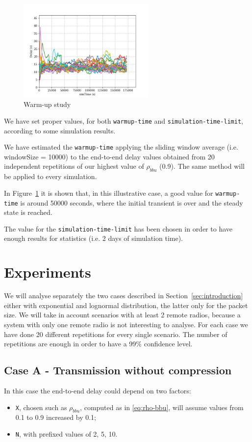 \documentclass[11pt,a4paper,oneside, openright]{article}
\begin{document}
\begin{figure}[H]
  \centering
  \includegraphics[width=0.6\textwidth]{images/warm-up}
  \caption{Warm-up study}
  \label{fig:warm-up-study}
\end{figure}

We have set proper values, for both \texttt{warmup-time} and \texttt{simulation-time-limit}, according to some simulation results.

We have estimated the \texttt{warmup-time} applying the sliding window average (i.e. windowSize = 10000) to the end-to-end delay values obtained from 20 independent repetitions of our highest value of $ \rho_{bbu} $ (0.9). The same method will be applied to every simulation.

In Figure~\ref{fig:warm-up-study} it is shown that, in this illustrative case, a good value for \texttt{warmup-time} is around 50000 seconds, where the initial transient is over and the steady state is reached. 

The value for the \texttt{simulation-time-limit} has been chosen in order to have enough results for statistics (i.e. 2 days of simulation time).

\section{Experiments}
We will analyse separately the two cases described in Section~\ref{sec:introduction} either with exponential and lognormal distribution, the latter only for the packet size.
We will take in account scenarios with at least 2 remote radios, because a system with only one remote radio is not interesting to analyse. For each case we have done 20 different repetitions for every single scenario.
The number of repetitions are enough in order to have a 99\% confidence level. 

\subsection{Case A - Transmission without compression}
In this case the end-to-end delay could depend on two factors:
\begin{itemize}
	\item \texttt{X}, chosen such as $ \rho_{bbu} $, computed as in \ref{eq:rho-bbu}, will assume values from 0.1 to 0.9 increased by 0.1;
	\item \texttt{N}, with prefixed values of 2, 5, 10.
\end{itemize}
\end{document}
